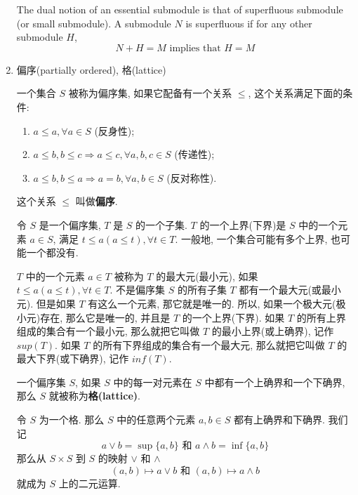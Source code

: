 \documentclass{ctexart}
\begin{document}
\begin{enumerate}
The dual notion of an essential submodule is that of superfluous submodule (or small submodule). A submodule $N$ is superfluous if for any other submodule $H$,
\[
N + H = M \mbox{ implies that } H = M
\]

\item 偏序(partially ordered), 格(lattice) \cite{hazewinkel2004algebras}

一个集合 $S$ 被称为偏序集, 如果它配备有一个关系 $\leq$, 这个关系满足下面的条件:
\begin{enumerate}
  \item $a \leq a, \forall a \in S$ (反身性);
  \item $a \leq b, b \leq c \Rightarrow a \leq c, \forall a,b,c \in S$ (传递性);
  \item $a \leq b, b \leq a \Rightarrow a = b, \forall a,b \in S$ (反对称性).
\end{enumerate}
这个关系 $\leq$ 叫做\textbf{偏序}.

令 $S$ 是一个偏序集, $T$ 是 $S$ 的一个子集. $T$ 的一个上界(下界)是 $S$ 中的一个元素 $a \in S$, 满足 $t \leq a (a \leq t), \forall t \in T$. 一般地, 一个集合可能有多个上界, 也可能一个都没有.

$T$ 中的一个元素 $a \in T$ 被称为 $T$ 的最大元(最小元), 如果 $t \leq a (a \leq t), \forall t \in T$. 不是偏序集 $S$ 的所有子集 $T$ 都有一个最大元(或最小元). 但是如果 $T$ 有这么一个元素, 那它就是唯一的.
所以, 如果一个极大元(极小元)存在, 那么它是唯一的, 并且是 $T$ 的一个上界(下界). 如果 $T$ 的所有上界组成的集合有一个最小元, 那么就把它叫做 $T$ 的最小上界(或上确界), 记作 $sup(T)$. 如果 $T$ 的所有下界组成的集合有一个最大元, 那么就把它叫做 $T$ 的最大下界(或下确界), 记作 $inf(T)$.

一个偏序集 $S$, 如果 $S$ 中的每一对元素在 $S$ 中都有一个上确界和一个下确界, 那么 $S$ 就被称为\textbf{格(lattice)}.

令 $S$ 为一个格. 那么 $S$ 中的任意两个元素 $a,b \in S$ 都有上确界和下确界. 我们记
\[
a \vee b = \sup\{a,b\} \mbox{  和  } a \wedge b = \inf\{a,b\}
\]
那么从 $S \times S$ 到 $S$ 的映射 $\vee$ 和 $\wedge$
\[
(a,b) \mapsto a \vee b \mbox{  和  } (a,b) \mapsto a \wedge b
\]
就成为 $S$ 上的二元运算.
\end{enumerate}
\printbibliography
\end{document}
